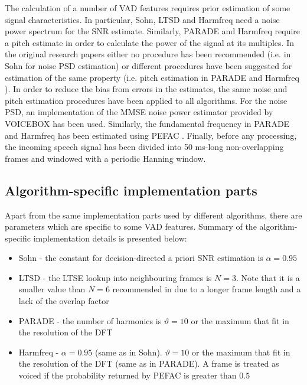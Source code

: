 The calculation of a number of VAD features requires prior estimation of some signal characteristics. In particular, Sohn, LTSD and Harmfreq need a noise power spectrum for the SNR estimate. Similarly, PARADE and Harmfreq require a pitch estimate in order to calculate the power of the signal at its multiples. In the original research papers either no procedure has been recommended (i.e. in Sohn \cite{Sohn} for noise PSD estimation) or different procedures have been suggested for estimation of the same property (i.e. pitch estimation in PARADE \cite{PARADE} and Harmfreq \cite{Tan}). In order to reduce the bias from errors in the estimates, the same noise and pitch estimation procedures have been applied to all algorithms. For the noise PSD, an implementation of the MMSE noise power estimator \cite{MMSEnoise} provided by VOICEBOX \cite{VOICEBOX} has been used. Similarly, the fundamental frequency in PARADE and Harmfreq has been estimated using PEFAC \cite{PEFAC}. Finally, before any processing, the incoming speech signal has been divided into 50 ms-long non-overlapping frames and windowed with a periodic Hanning window.

\subsection{Algorithm-specific implementation parts}

Apart from the same implementation parts used by different algorithms, there are parameters which are specific to some VAD features. Summary of the algorithm-specific implementation details is presented below:

\begin{itemize}
\item Sohn - the constant for decision-directed a priori SNR estimation is $\alpha = 0.95$
\item LTSD - the LTSE lookup into neighbouring frames is $N = 3$. Note that it is a smaller value than $N=6$ recommended in \cite{LTSD} due to a longer frame length and a lack of the overlap factor
\item PARADE - the number of harmonics is $\vartheta = 10$ or the maximum that fit in the resolution of the DFT
\item Harmfreq - $\alpha = 0.95$ (same as in Sohn). $\vartheta = 10$ or the maximum that fit in the resolution of the DFT (same as in PARADE). A frame is treated as voiced if the probability returned by PEFAC is greater than $0.5$
\end{itemize}


